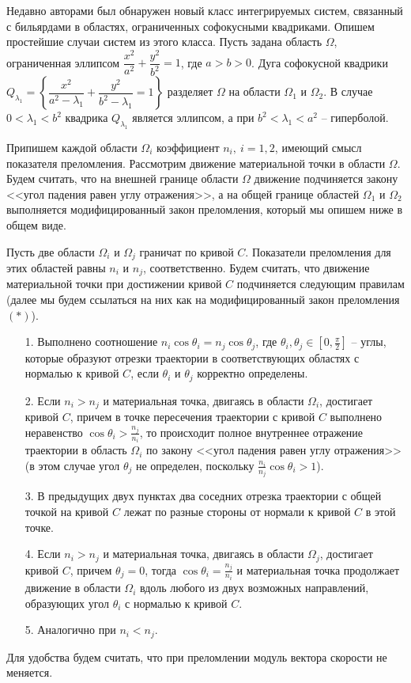 Недавно авторами был обнаружен новый класс интегрируемых систем, связанный с бильярдами в областях, ограниченных софокусными квадриками.
Опишем простейшие случаи систем из этого класса.
Пусть задана область $\Omega$, ограниченная эллипсом 
$\dfrac{x^2}{a^2} + \dfrac{y^2}{b^2} = 1$, где $a > b > 0$.
Дуга софокусной квадрики $Q_{\lambda_1} = \left\{ \dfrac{x^2}{a^2-\lambda_1} + \dfrac{y^2}{b^2-\lambda_1} = 1 \right\}$ разделяет  $\Omega$ на области $\Omega_1$ и $\Omega_2$.
В случае $0 < \lambda_1 < b^2$ квадрика $Q_{\lambda_1}$ является эллипсом, а при $b^2 < \lambda_1 < a^2$ -- гиперболой.

Припишем каждой области $\Omega_i$  коэффициент $n_i,\  i=1,2$, имеющий смысл показателя преломления. 
Рассмотрим движение материальной точки в области $\Omega$. Будем считать, что на внешней границе области $\Omega$ движение подчиняется закону <<угол падения равен углу отражения>>, 
а на общей границе областей $\Omega_1$ и $\Omega_2$ выполняется модифицированный закон преломления, который мы опишем ниже в общем виде.

Пусть две области $\Omega_i$ и $\Omega_j$ граничат по кривой $C$. 
Показатели преломления для этих областей равны $n_i$ и $n_j$, соответственно.
Будем считать, что движение материальной точки при достижении кривой $C$ подчиняется следующим правилам (далее мы будем ссылаться на них как на модифицированный закон преломления $(\ast)$).
\begin{itemize}
\item[1.] Выполнено соотношение $n_i \cos \theta_i = n_j \cos \theta_j $, где $\theta_i, \theta_j \in [0,\frac{\pi}{2} ]$ -- углы, которые образуют отрезки траектории   в соответствующих областях с нормалью к кривой $C$, если $\theta_i$ и $\theta_j$ корректно определены.
\item[2.] Если $n_i > n_j$ и материальная точка, двигаясь в области $\Omega_i$, достигает кривой $C$, причем в точке пересечения траектории с кривой $C$ выполнено неравенство $\cos \theta_i > \frac{n_j}{n_i}$, то происходит полное внутреннее отражение траектории в область $\Omega_i$ по закону <<угол падения равен углу отражения>> (в этом случае угол $\theta_j$ не определен, поскольку $\frac{n_i}{n_j} \cos \theta_i > 1$). 
\item[3.] В предыдущих двух пунктах два соседних отрезка траектории с общей точкой на кривой $C$ лежат по разные стороны от нормали к кривой $C$ в этой точке.
\item[4.] Если $n_i > n_j$ и материальная точка, двигаясь в области $\Omega_j$, достигает кривой $C$, причем $\theta_j = 0$, тогда $\cos \theta_i = \frac{n_j}{n_i}$ и материальная точка продолжает движение в области $\Omega_i$ вдоль любого из двух возможных направлений, образующих угол $\theta_i$ с нормалью к кривой $C$.
\item[5.] Аналогично при $n_i < n_j$.
\end{itemize}
Для удобства будем считать, что при преломлении модуль вектора скорости не меняется.

